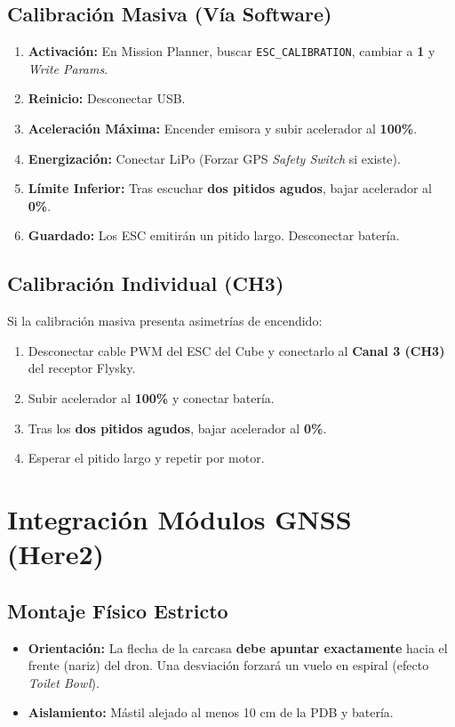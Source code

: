 \documentclass[11pt,a4paper]{article}
\begin{document}
\subsection{Calibración Masiva (Vía Software)}
\begin{enumerate}[leftmargin=*,noitemsep]
    \item \textbf{Activación:} En Mission Planner, buscar \texttt{ESC\_CALIBRATION}, cambiar a \textbf{1} y \textit{Write Params}.
    \item \textbf{Reinicio:} Desconectar USB.
    \item \textbf{Aceleración Máxima:} Encender emisora y subir acelerador al \textbf{100\%}.
    \item \textbf{Energización:} Conectar LiPo (Forzar GPS \textit{Safety Switch} si existe).
    \item \textbf{Límite Inferior:} Tras escuchar \textbf{dos pitidos agudos}, bajar acelerador al \textbf{0\%}.
    \item \textbf{Guardado:} Los ESC emitirán un pitido largo. Desconectar batería.
\end{enumerate}

\subsection{Calibración Individual (CH3)}
Si la calibración masiva presenta asimetrías de encendido:
\begin{enumerate}[leftmargin=*,noitemsep]
    \item Desconectar cable PWM del ESC del Cube y conectarlo al \textbf{Canal 3 (CH3)} del receptor Flysky.
    \item Subir acelerador al \textbf{100\%} y conectar batería.
    \item Tras los \textbf{dos pitidos agudos}, bajar acelerador al \textbf{0\%}.
    \item Esperar el pitido largo y repetir por motor.
\end{enumerate}

\section{Integración Módulos GNSS (Here2)}
\subsection{Montaje Físico Estricto}
\begin{itemize}[leftmargin=*,noitemsep]
    \item \textbf{Orientación:} La flecha de la carcasa \textbf{debe apuntar exactamente} hacia el frente (nariz) del dron. Una desviación forzará un vuelo en espiral (efecto \textit{Toilet Bowl}).
    \item \textbf{Aislamiento:} Mástil alejado al menos 10 cm de la PDB y batería.
\end{itemize}
\end{document}
